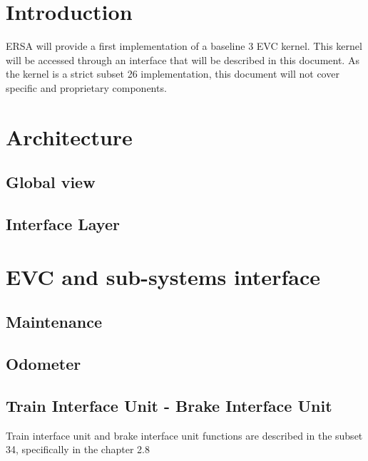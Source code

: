 \documentclass{template/openetcs_article}
\begin{document}


\section{Introduction}

ERSA will provide a first implementation of a baseline 3 EVC kernel. This kernel will be accessed through an interface that will be described in this document. As the kernel is a strict subset 26 implementation, this document will not cover specific and proprietary components. 

\section{Architecture}
	\subsection{Global view}
	\subsection{Interface Layer}
\section{EVC and sub-systems interface}
	\subsection{Maintenance}
	\subsection{Odometer}
	\subsection{Train Interface Unit - Brake Interface Unit}
		Train interface unit and brake interface unit functions are described in the subset 34, specifically in the chapter 2.8 
\end{document}
